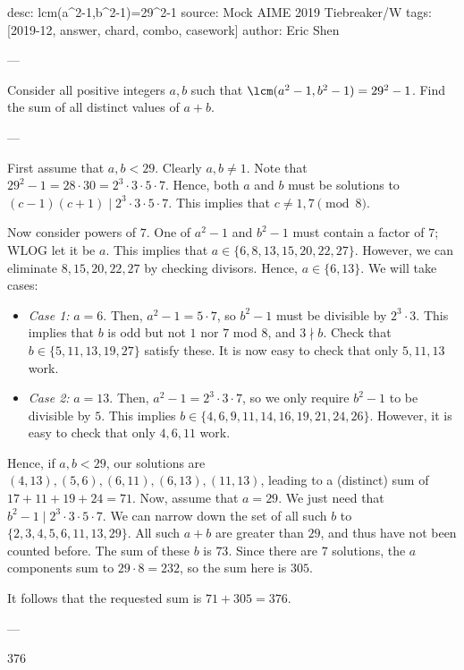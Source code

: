 desc: lcm(a^2-1,b^2-1)=29^2-1
source: Mock AIME 2019 Tiebreaker/W
tags: [2019-12, answer, chard, combo, casework]
author: Eric Shen

---

Consider all positive integers $a,b$ such that $\lcm(a^2-1,b^2-1)=29^2-1$. Find the sum of all distinct values of $a+b$.

---

First assume that $a,b<29$. Clearly $a,b\ne 1$. Note that $29^2-1=28\cdot 30=2^3\cdot 3\cdot 5\cdot 7$. Hence, both $a$ and $b$ must be solutions to $(c-1)(c+1)\mid 2^3\cdot 3\cdot 5\cdot 7$. This implies that $c\neq 1,7\pmod8$.

Now consider powers of $7$. One of $a^2-1$ and $b^2-1$ must contain a factor of $7$; WLOG let it be $a$. This implies that $a\in\{6,8,13,15,20,22,27\}$. However, we can eliminate $8,15,20,22,27$ by checking divisors. Hence, $a\in\{6,13\}$. We will take cases:
\begin{itemize}
    \item \textit{Case 1:} $a=6$. Then, $a^2-1=5\cdot 7$, so $b^2-1$ must be divisible by $2^3\cdot 3$. This implies that $b$ is odd but not $1$ nor $7$ mod $8$, and $3\nmid b$. Check that $b\in\{5,11,13,19,27\}$ satisfy these. It is now easy to check that only $5,11,13$ work.
    \item \textit{Case 2:} $a=13$. Then, $a^2-1=2^3\cdot 3\cdot 7$, so we only require $b^2-1$ to be divisible by $5$. This implies $b\in\{4,6,9,11,14,16,19,21,24,26\}$. However, it is easy to check that only $4,6,11$ work.
\end{itemize}
Hence, if $a,b<29$, our solutions are $(4,13),(5,6),(6,11),(6,13),(11,13)$, leading to a (distinct) sum of $17+11+19+24=71$. Now, assume that $a=29$. We just need that $b^2-1\mid 2^3\cdot 3\cdot 5\cdot 7$. We can narrow down the set of all such $b$ to $\{2,3,4,5,6,11,13,29\}$. All such $a+b$ are greater than $29$, and thus have not been counted before. The sum of these $b$ is $73$. Since there are $7$ solutions, the $a$ components sum to $29\cdot 8=232$, so the sum here is $305$.

It follows that the requested sum is $71+305=376$.

---

376
